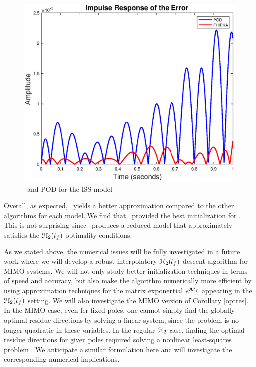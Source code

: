\documentclass[twocolumn]{autart}
\begin{document}
 
 \begin{figure}[H]
 \centering
   \includegraphics [scale=0.35]{ISS1RErrorSmooth}
      \caption{\FH \ and POD for the ISS model \label{fig:impulse}}
 \end{figure}


 
 
  Overall,  as expected, \FH \ yields a better approximation compared to the other algorithms for each model. 
 We find that \goyal\  provided the best initialization for \FH. This is not surprising since \goyal\ produces a reduced-model that approximately satisfies the $\EuScript{H}_2(t_f)$ optimality conditions. 
 
 As we stated above, the numerical issues will be fully investigated  in a future work where we will develop a robust interpolatory $\EuScript{H}_2(t_f)$-descent algorithm for MIMO systems. We will not only study better initialization techniques in terms of speed and accuracy, but also make the algorithm numerically more efficient by using approximation  techniques for the matrix exponential $e^{\mathbf{A} t_f}$ appearing in the $\EuScript{H}_2(t_f)$ setting. 
We will also investigate the MIMO version of Corollary \ref{optres}. In the MIMO case, even for fixed poles, one cannot simply find the globally optimal residue directions by solving a linear system, since the problem is no longer quadratic in these variables. In the regular $\EuScript{H}_2$ case, finding the optimal residue directions for given poles required solving a nonlinear least-squares problem \cite{beattie2012realization}. We anticipate a similar formulation here and will investigate the corresponding numerical implications. 
 
\end{document}
